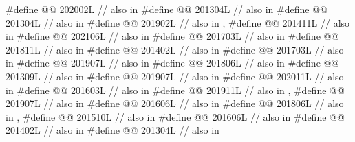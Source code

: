 \begin{codeblock}
#define @@      202002L // also in 
#define @@                  201304L // also in 
#define @@        201304L // also in 
#define @@                       201902L // also in , 
#define @@                            201411L // also in 
#define @@                          202106L // also in 
#define @@                      201703L // also in 
#define @@             201811L // also in 
#define @@                          201402L // also in 
#define @@                      201703L // also in 
#define @@              201907L // also in 
#define @@            201806L // also in 
#define @@                   201309L // also in 
#define @@       201907L // also in 
#define @@                    202011L // also in 
#define @@                      201603L // also in 
#define @@                           201911L // also in , 
#define @@                             201907L // also in 
#define @@                           201606L // also in 
#define @@           201806L // also in , 
#define @@                    201510L // also in 
#define @@                   201606L // also in 
#define @@             201402L // also in 
#define @@                       201304L // also in 

\end{codeblock}
